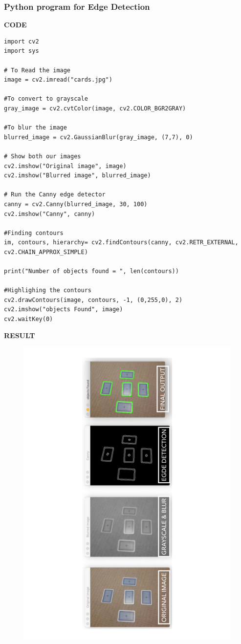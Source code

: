 \documentclass[14pt,a4paper]{article}
\begin{document}
\subsubsection{Python program for Edge Detection}
\par \textbf{CODE}
\begin{lstlisting}
import cv2
import sys

# To Read the image
image = cv2.imread("cards.jpg")

#To convert to grayscale
gray_image = cv2.cvtColor(image, cv2.COLOR_BGR2GRAY)

#To blur the image
blurred_image = cv2.GaussianBlur(gray_image, (7,7), 0)

# Show both our images
cv2.imshow("Original image", image)
cv2.imshow("Blurred image", blurred_image)

# Run the Canny edge detector
canny = cv2.Canny(blurred_image, 30, 100)
cv2.imshow("Canny", canny)

#Finding contours
im, contours, hierarchy= cv2.findContours(canny, cv2.RETR_EXTERNAL, cv2.CHAIN_APPROX_SIMPLE)

print("Number of objects found = ", len(contours))

#Highlighing the contours
cv2.drawContours(image, contours, -1, (0,255,0), 2)
cv2.imshow("objects Found", image)
cv2.waitKey(0)
\end{lstlisting}
\par \textbf{RESULT}
\begin{figure}[h]
\centering
\includegraphics[scale=0.5,angle=270]{pythonED.pdf}
\end{figure}
\end{document}
